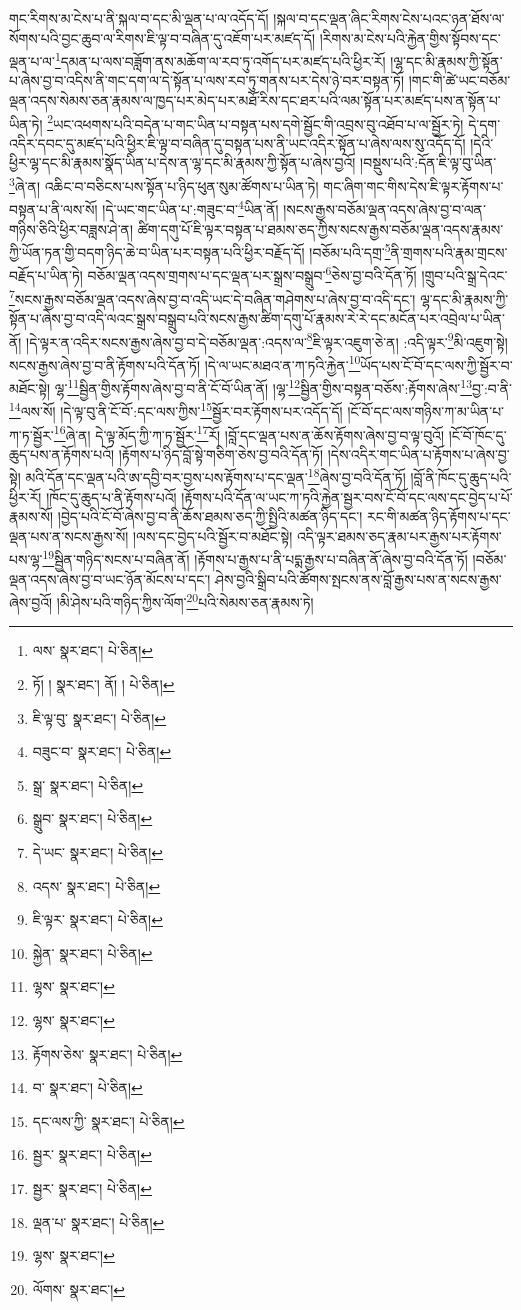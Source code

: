 གང་རིགས་མ་ངེས་པ་ནི་སྐལ་བ་དང་མི་ལྡན་པ་ལ་འདོད་དོ། །སྐལ་བ་དང་ལྡན་ཞིང་རིགས་ངེས་པའང་ཉན་ཐོས་ལ་སོགས་པའི་བྱང་ཆུབ་ལ་རིགས་ཇི་ལྟ་བ་བཞིན་དུ་འཇོག་པར་མཛད་དོ། །རིགས་མ་ངེས་པའི་རྐྱེན་གྱིས་སྟོབས་དང་ལྡན་པ་ལ་\footnote{ལས་  སྣར་ཐང་།  པེ་ཅིན། }དམན་པ་ལས་བཟློག་ནས་མཆོག་ལ་རབ་ཏུ་འགོད་པར་མཛད་པའི་ཕྱིར་རོ། །ལྷ་དང་མི་རྣམས་ཀྱི་སྟོན་པ་ཞེས་བྱ་བ་འདིས་ནི་གང་དག་ལ་དེ་སྟོན་པ་ལས་རབ་ཏུ་གནས་པར་དེས་ཉེ་བར་བསྟན་ཏོ། །གང་གི་ཚེ་ཡང་བཅོམ་ལྡན་འདས་སེམས་ཅན་རྣམས་ལ་ཁྱད་པར་མེད་པར་མཐོ་རིས་དང་ཐར་པའི་ལམ་སྟོན་པར་མཛད་པས་ན་སྟོན་པ་ཡིན་ཏེ། \footnote{ཏོ། །   སྣར་ཐང་། ནོ། །   པེ་ཅིན། }ཡང་འཕགས་པའི་བདེན་པ་གང་ཡིན་པ་བསྟན་པས་དགེ་སྦྱོང་གི་འབྲས་བུ་འཐོབ་པ་ལ་སྦྱོར་ཏེ། དེ་དག་འདིར་དབང་དུ་མཛད་པའི་ཕྱིར་ཇི་ལྟ་བ་བཞིན་དུ་བསྟན་པས་ནི་ཡང་འདིར་སྟོན་པ་ཞེས་ལས་སུ་འདོད་དོ། །དེའི་ཕྱིར་ལྷ་དང་མི་རྣམས་སྣོད་ཡིན་པ་དེས་ན་ལྷ་དང་མི་རྣམས་ཀྱི་སྟོན་པ་ཞེས་བྱའོ། །བསྡུས་པའི་:དོན་ཇི་ལྟ་བུ་ཡིན་\footnote{ཇི་ལྟ་བུ་  སྣར་ཐང་།  པེ་ཅིན། }ཞེ་ན། འཆིང་བ་བཅིངས་པས་སྟོན་པ་ཉིད་ཕུན་སུམ་ཚོགས་པ་ཡིན་ཏེ། གང་ཞིག་གང་གིས་དེས་ཇི་ལྟར་རྟོགས་པ་བསྟན་པ་ནི་ལས་སོ། །དེ་ཡང་གང་ཡིན་པ་:གཟུང་བ་\footnote{བཟུང་བ་  སྣར་ཐང་།  པེ་ཅིན། }ཡིན་ནོ། །སངས་རྒྱས་བཅོམ་ལྡན་འདས་ཞེས་བྱ་བ་ལན་གཉིས་ཅིའི་ཕྱིར་བཟླས་ཤེ་ན། ཚིག་དགུ་པོ་ཇི་ལྟར་བསྟན་པ་ཐམས་ཅད་ཀྱིས་སངས་རྒྱས་བཅོམ་ལྡན་འདས་རྣམས་ཀྱི་ཡོན་ཏན་གྱི་བདག་ཉིད་ཆེ་བ་ཡིན་པར་བསྟན་པའི་ཕྱིར་བརྗོད་དོ། །བཅོམ་པའི་དགྲ་\footnote{སྒྲ་  སྣར་ཐང་།  པེ་ཅིན། }ནི་གྲགས་པའི་རྣམ་གྲངས་བརྗོད་པ་ཡིན་ཏེ། བཅོམ་ལྡན་འདས་གྲགས་པ་དང་ལྡན་པར་སྒྲས་བསྒྲུབ་\footnote{སྒྲུབ་  སྣར་ཐང་།  པེ་ཅིན། }ཅེས་བྱ་བའི་དོན་ཏོ། །གྲུབ་པའི་སྒྲ་དེའང་\footnote{དེ་ཡང་  སྣར་ཐང་།  པེ་ཅིན། }སངས་རྒྱས་བཅོམ་ལྡན་འདས་ཞེས་བྱ་བ་འདི་ཡང་དེ་བཞིན་གཤེགས་པ་ཞེས་བྱ་བ་འདི་དང་། ལྷ་དང་མི་རྣམས་ཀྱི་སྟོན་པ་ཞེས་བྱ་བ་འདི་ལའང་སྒྲས་བསྒྲུབ་པའི་སངས་རྒྱས་ཚིག་དགུ་པོ་རྣམས་རེ་རེ་དང་མངོན་པར་འབྲེལ་པ་ཡིན་ནོ། །དེ་ལྟར་ན་འདིར་སངས་རྒྱས་ཞེས་བྱ་བ་དེ་བཅོམ་ལྡན་:འདས་ལ་\footnote{འདས་  སྣར་ཐང་།  པེ་ཅིན། }ཇི་ལྟར་འཇུག་ཅེ་ན། :འདི་ལྟར་\footnote{ཇི་ལྟར་  སྣར་ཐང་།  པེ་ཅིན། }མི་འཇུག་སྟེ། སངས་རྒྱས་ཞེས་བྱ་བ་ནི་རྟོགས་པའི་དོན་ཏོ། །དེ་ལ་ཡང་མཐའ་ན་ཀ་ཏའི་རྐྱེན་\footnote{སྐྱེན་  སྣར་ཐང་།  པེ་ཅིན། }ཡོད་པས་ངོ་བོ་དང་ལས་ཀྱི་སྦྱོར་བ་མཐོང་སྟེ། ལྷ་\footnote{ལྷས་  སྣར་ཐང་། }སྦྱིན་གྱིས་རྟོགས་ཞེས་བྱ་བ་ནི་ངོ་བོ་ཡིན་ནོ། །ལྷ་\footnote{ལྷས་  སྣར་ཐང་། }སྦྱིན་གྱིས་བསྟན་བཅོས་:རྟོགས་ཞེས་\footnote{རྟོགས་ཅེས་  སྣར་ཐང་།  པེ་ཅིན། }བྱ་:བ་ནི་\footnote{བ་  སྣར་ཐང་།  པེ་ཅིན། }ལས་སོ། །དེ་ལྟ་བུ་ནི་ངོ་བོ་:དང་ལས་ཀྱིས་\footnote{དང་ལས་ཀྱི་  སྣར་ཐང་།  པེ་ཅིན། }སྦྱོར་བར་རྟོགས་པར་འདོད་དོ། །ངོ་བོ་དང་ལས་གཉིས་ཀ་མ་ཡིན་པ་ཀ་ཏ་སྦྱོར་\footnote{སྦྱར་  སྣར་ཐང་།  པེ་ཅིན། }ཞེ་ན། དེ་ལྟ་མོད་ཀྱི་ཀ་ཏ་སྦྱོར་\footnote{སྦྱར་  སྣར་ཐང་།  པེ་ཅིན། }རོ། །བློ་དང་ལྡན་པས་ན་ཆོས་རྟོགས་ཞེས་བྱ་བ་ལྟ་བུའོ། །ངོ་བོ་ཁོང་དུ་ཆུད་པས་ན་རྟོགས་པའོ། །རྟོགས་པ་ཉིད་བློ་སྟེ་གཅིག་ཅེས་བྱ་བའི་དོན་ཏོ། །དེས་འདིར་གང་ཡིན་པ་རྟོགས་པ་ཞེས་བྱ་སྟེ། མའི་དོན་དང་ལྡན་པའི་ཨ་དབྱི་བར་བྱས་པས་རྟོགས་པ་དང་ལྡན་\footnote{ལྡན་པ་  སྣར་ཐང་།  པེ་ཅིན། }ཞེས་བྱ་བའི་དོན་ཏོ། །བློ་ནི་ཁོང་དུ་ཆུད་པའི་ཕྱིར་རོ། །ཁོང་དུ་ཆུད་པ་ནི་རྟོགས་པའོ། །རྟོགས་པའི་དོན་ལ་ཡང་ཀ་ཏའི་རྐྱེན་སྦྱར་བས་ངོ་བོ་དང་ལས་དང་བྱེད་པ་པོ་རྣམས་སོ། །བྱེད་པའི་ངོ་བོ་ཞེས་བྱ་བ་ནི་ཆོས་ཐམས་ཅད་ཀྱི་སྤྱིའི་མཚན་ཉིད་དང་། རང་གི་མཚན་ཉིད་རྟོགས་པ་དང་ལྡན་པས་ན་སངས་རྒྱས་སོ། །ལས་དང་བྱེད་པའི་སྦྱོར་བ་མཐོང་སྟེ། འདི་ལྟར་ཐམས་ཅད་རྣམ་པར་རྒྱས་པར་རྟོགས་པས་ལྷ་\footnote{ལྷས་  སྣར་ཐང་། }སྦྱིན་གཉིད་སངས་པ་བཞིན་ནོ། །རྟོགས་པ་རྒྱས་པ་ནི་པདྨ་རྒྱས་པ་བཞིན་ནོ་ཞེས་བྱ་བའི་དོན་ཏོ། །བཅོམ་ལྡན་འདས་ཞེས་བྱ་བ་ཡང་ཉོན་མོངས་པ་དང་། ཤེས་བྱའི་སྒྲིབ་པའི་ཚོགས་སྤངས་ནས་བློ་རྒྱས་པས་ན་སངས་རྒྱས་ཞེས་བྱའོ། །མི་ཤེས་པའི་གཉིད་ཀྱིས་ལོག་\footnote{ལོགས་  སྣར་ཐང་། }པའི་སེམས་ཅན་རྣམས་ཏེ། 